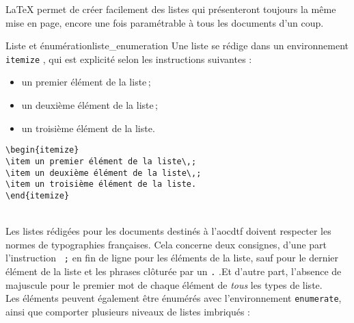 \documentclass[a4paper, 11pt, twoside, fleqn]{memoir}
\begin{document}
\LaTeX{} permet de créer facilement des listes qui présenteront toujours la même mise en page, encore une fois paramétrable à tous les documents d'un coup. 

\begin{exemple}{Liste et énumération}{liste_enumeration}
Une liste se rédige dans un environnement \texttt{itemize} , qui est explicité selon les instructions suivantes :\\

\begin{minipage}[t]{0.4\linewidth}
\begin{itemize}
\item un premier élément de la liste\,;
\item un deuxième élément de la liste\,;
\item un troisième élément de la liste.
\end{itemize}
\end{minipage}
\hfill
\begin{minipage}[t]{0.55\linewidth}
\begin{verbatim}
\begin{itemize}
\item un premier élément de la liste\,;
\item un deuxième élément de la liste\,;
\item un troisième élément de la liste.
\end{itemize}
\end{verbatim}
\end{minipage}\\

Les listes rédigées pour les documents destinés à l'\gls{aocdtf} doivent respecter les normes de typographies françaises. Cela concerne deux consignes, d'une part l'instruction \texttt{\,;} en fin de ligne pour les éléments de la liste, sauf pour le dernier élément de la liste et les phrases clôturée par un \texttt{.} .Et d'autre part, l'absence de majuscule pour le premier mot de chaque élément de \emph{tous} les types de liste.\\

Les éléments peuvent également être énumérés avec l'environnement \texttt{enumerate}, ainsi que comporter plusieurs niveaux de listes imbriqués :\\


\end{exemple}
\end{document}
